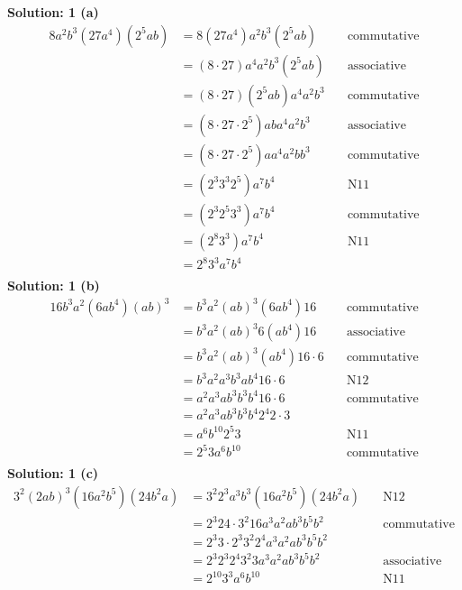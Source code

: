 \documentclass[6pt]{article}
\begin{document}
\textbf{Solution: 1 (a)}
\begin{align*}
8 a^2 b^3 (27 a^4) (2^5 a b) &= 8 (27 a^4) a^2 b^3 (2^5 a b) & \quad \text{commutative} \\
&= (8 \cdot 27 ) a^4 a^2 b^3 (2^5 a b) & \quad \text{associative} \\
&= (8 \cdot 27 ) (2^5 a b) a^4 a^2 b^3 & \quad \text{commutative} \\
&= (8 \cdot 27 \cdot 2^5) a b a^4 a^2 b^3 & \quad \text{associative} \\
&= (8 \cdot 27 \cdot 2^5) a a^4 a^2 b b^3 & \quad \text{commutative} \\
&= (2^3 3^3 2^5) a^7 b^4 & \quad \text{N11} \\
&= (2^3 2^5 3^3) a^7 b^4 & \quad \text{commutative} \\
&= (2^8 3^3) a^7 b^4 & \quad \text{N11} \\
&= 2^8 3^3  a^7 b^4 & \\
\end{align*}
\textbf{Solution: 1 (b)}
\begin{align*}
16 b^3 a^2 (6 a b^4) {(a b)}^3 &= b^3 a^2 {(a b)}^3 (6 a b^4) 16 & \quad \text{commutative} \\
&= b^3 a^2 {(a b)}^3  6 (a b^4) 16 & \quad \text{associative} \\
&= b^3 a^2 {(a b)}^3 (a b^4) 16 \cdot 6 & \quad \text{commutative} \\
&= b^3 a^2 a^3 b^3 a b^4 16 \cdot 6 & \quad \text{N12} \\
&= a^2 a^3 a b^3 b^3 b^4 16 \cdot 6 & \quad \text{commutative} \\
&= a^2 a^3 a b^3 b^3 b^4 2^4 2 \cdot 3 & \quad \text{} \\
&= a^6 b^{10} 2^5 3  & \quad \text{N11} \\
&= 2^5 3 a^6 b^{10} & \quad \text{commutative} \\
\end{align*}
\textbf{Solution: 1 (c)}
\begin{align*}
3^2 {(2 a b)}^3 (16 a^2 b^5) (24 b^2 a) &= 3^2 2^3 a^3 b^3 (16 a^2 b^5) (24 b^2 a) & \quad \text{N12} \\
&= 2^3 24 \cdot 3^2 16 a^3 a^2 a b^3 b^5 b^2 & \quad \text{commutative} \\
&= 2^3 3 \cdot 2^3 3^2 2^4 a^3 a^2 a b^3 b^5 b^2 & \quad \text{} \\
&= 2^3 2^3 2^4 3^2 3 a^3 a^2 a b^3 b^5 b^2 & \quad \text{associative} \\
&= 2^{10} 3^3 a^6 b^{10} & \quad \text{N11} \\
\end{align*}
\end{document}
